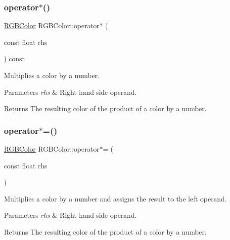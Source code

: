 \subsubsection{\texorpdfstring{operator$\ast$()}{operator*()}\hspace{0.1cm}{\footnotesize\ttfamily [2/2]}}
{\footnotesize\ttfamily \hyperlink{class_r_g_b_color}{R\+G\+B\+Color} R\+G\+B\+Color\+::operator$\ast$ (\begin{DoxyParamCaption}\item[{const float}]{rhs }\end{DoxyParamCaption}) const\hspace{0.3cm}{\ttfamily [inline]}}

Multiplies a color by a number. 
\begin{DoxyParams}{Parameters}
{\em rhs} & Right hand side operand. \\
\hline
\end{DoxyParams}
\begin{DoxyReturn}{Returns}
The resulting color of the product of a color by a number. 
\end{DoxyReturn}
\hypertarget{group___utilities_ga1b8ab73352d66c6d0125d6f061a1982f}{}\label{group___utilities_ga1b8ab73352d66c6d0125d6f061a1982f} 
\subsubsection{\texorpdfstring{operator$\ast$=()}{operator*=()}}
{\footnotesize\ttfamily \hyperlink{class_r_g_b_color}{R\+G\+B\+Color} R\+G\+B\+Color\+::operator$\ast$= (\begin{DoxyParamCaption}\item[{const float}]{rhs }\end{DoxyParamCaption})\hspace{0.3cm}{\ttfamily [inline]}}

Multiplies a color by a number and assigns the result to the left operand. 
\begin{DoxyParams}{Parameters}
{\em rhs} & Right hand side operand. \\
\hline
\end{DoxyParams}
\begin{DoxyReturn}{Returns}
The resulting color of the product of a color by a number. 
\end{DoxyReturn}
\hypertarget{group___utilities_gab8eb3021ce94a9a4fc7a1ba1e8c06a30}{}\label{group___utilities_gab8eb3021ce94a9a4fc7a1ba1e8c06a30} 
